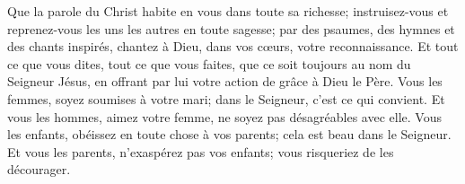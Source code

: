 Que la parole du Christ habite en vous dans toute sa richesse;
	instruisez-vous et reprenez-vous les uns les autres en toute sagesse;
	par des psaumes, des hymnes et des chants inspirés,
	chantez à Dieu, dans vos cœurs, votre reconnaissance.
Et tout ce que vous dites, tout ce que vous faites,
	que ce soit toujours au nom du Seigneur Jésus,
	en offrant par lui votre action de grâce à Dieu le Père.
Vous les femmes, soyez soumises à votre mari;
	dans le Seigneur, c’est ce qui convient.
Et vous les hommes, aimez votre femme,
	ne soyez pas désagréables avec elle.
Vous les enfants, obéissez en toute chose à vos parents;
	cela est beau dans le Seigneur.
Et vous les parents, n’exaspérez pas vos enfants;
	vous risqueriez de les décourager.
